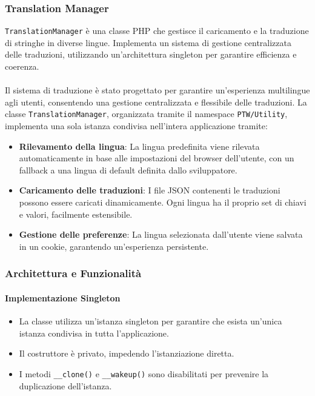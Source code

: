 \subsubsection{Translation Manager}
\texttt{TranslationManager} \`e una classe PHP che gestisce il caricamento e la traduzione di stringhe in diverse lingue. Implementa un sistema di gestione centralizzata delle traduzioni, utilizzando un'architettura singleton per garantire efficienza e coerenza.
\\\\
Il sistema di traduzione \`e stato progettato per garantire un’esperienza multilingue agli utenti, consentendo una gestione centralizzata e flessibile delle traduzioni. La classe \texttt{TranslationManager}, organizzata tramite il namespace \texttt{PTW/Utility}, implementa una sola istanza condivisa nell’intera applicazione tramite:

\begin{itemize}
    \item \textbf{Rilevamento della lingua}: La lingua predefinita viene rilevata automaticamente in base alle impostazioni del browser dell’utente, con un fallback a una lingua di default definita dallo sviluppatore.
    \item \textbf{Caricamento delle traduzioni}: I file JSON contenenti le traduzioni possono essere caricati dinamicamente. Ogni lingua ha il proprio set di chiavi e valori, facilmente estensibile.
    \item \textbf{Gestione delle preferenze}: La lingua selezionata dall’utente viene salvata in un cookie, garantendo un’esperienza persistente.
\end{itemize}

\subsubsection{Architettura e Funzionalit\`a}

\paragraph{Implementazione Singleton}
\begin{itemize}
    \item La classe utilizza un'istanza singleton per garantire che esista un'unica istanza condivisa in tutta l'applicazione.
    \item Il costruttore \`e privato, impedendo l'istanziazione diretta.
    \item I metodi \texttt{\_\_clone()} e \texttt{\_\_wakeup()} sono disabilitati per prevenire la duplicazione dell'istanza.
\end{itemize}

